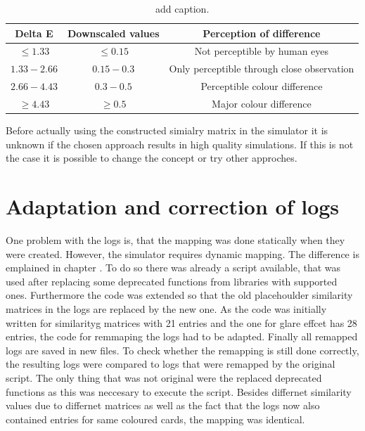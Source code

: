 \begin{table}[H]
	\centering
	\caption{add caption.}%
	\begin{tabular}{|c|c|c|}
		\hline
		Delta E & Downscaled values & Perception of difference \\
		\hline
		$\leq1.33$ & $\leq0.15$ & Not perceptible by human eyes\\
		$1.33-2.66$ &$0.15-0.3$  & Only perceptible through close observation \\
		$2.66-4.43$ & $0.3-0.5$ & Perceptible colour difference \\
		$\geq4.43$ &$\geq0.5$  & Major colour difference\\
		\hline
	\end{tabular}
\end{table}
Before actually using the constructed simialry matrix in the simulator it is unknown if the chosen approach results in high quality simulations. If this is not the case it is possible to change the concept or try other approches. 

\section{Adaptation and correction of logs}
One problem with the logs is, that the mapping was done statically when they were created. However, the simulator requires dynamic mapping. The difference is emplained in chapter . To do so there was already a script available, that was used after replacing some deprecated functions from libraries with supported ones. Furthermore the code was extended so that the old placehoulder similarity matrices in the logs are replaced by the new one. As the code was initially written for similarityg matrices with 21 entries and the one for glare effcet has 28 entries, the code for remmaping the logs had to be adapted. Finally all remapped logs are saved in new files. To check whether the remapping is still done correctly, the resulting logs were compared to logs that were remapped by the original script. The only thing that was not original were the replaced deprecated functions as this was neccesary to execute the script. Besides differnet similarity values due to differnet matrices as well as the fact that the logs now also contained entries for same coloured cards, the mapping was identical. 

